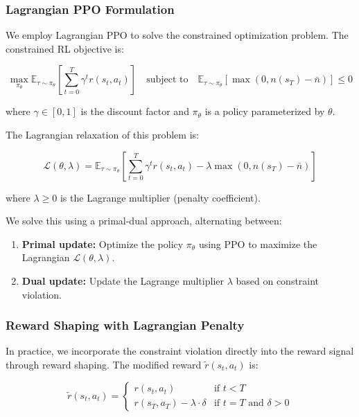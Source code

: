 \subsubsection{Lagrangian PPO Formulation}

We employ Lagrangian PPO to solve the constrained optimization problem. The constrained RL objective is:

\begin{equation}
\max_{\pi_\theta} \mathbb{E}_{\tau \sim \pi_\theta} \left[ \sum_{t=0}^{T} \gamma^t r(s_t, a_t) \right] \quad \text{subject to} \quad \mathbb{E}_{\tau \sim \pi_\theta} \left[ \max(0, n(s_T) - \bar{n}) \right] \leq 0
\label{eq:constrained-objective}
\tag{9}
\end{equation}

where $\gamma \in [0,1]$ is the discount factor and $\pi_\theta$ is a policy parameterized by $\theta$.

The Lagrangian relaxation of this problem is:

\begin{equation}
\mathcal{L}(\theta, \lambda) = \mathbb{E}_{\tau \sim \pi_\theta} \left[ \sum_{t=0}^{T} \gamma^t r(s_t, a_t) - \lambda \max(0, n(s_T) - \bar{n}) \right]
\label{eq:lagrangian}
\tag{10}
\end{equation}

where $\lambda \geq 0$ is the Lagrange multiplier (penalty coefficient).

We solve this using a primal-dual approach, alternating between:
\begin{enumerate}
\item \textbf{Primal update:} Optimize the policy $\pi_\theta$ using PPO to maximize the Lagrangian $\mathcal{L}(\theta, \lambda)$.
\item \textbf{Dual update:} Update the Lagrange multiplier $\lambda$ based on constraint violation.
\end{enumerate}

\subsubsection{Reward Shaping with Lagrangian Penalty}

In practice, we incorporate the constraint violation directly into the reward signal through reward shaping. The modified reward $\tilde{r}(s_t, a_t)$ is:

\begin{equation}
\tilde{r}(s_t, a_t) = \begin{cases}
r(s_t, a_t) & \text{if } t < T \\
r(s_T, a_T) - \lambda \cdot \delta & \text{if } t = T \text{ and } \delta > 0
\end{cases}
\label{eq:modified-reward}
\tag{11}
\end{equation}

